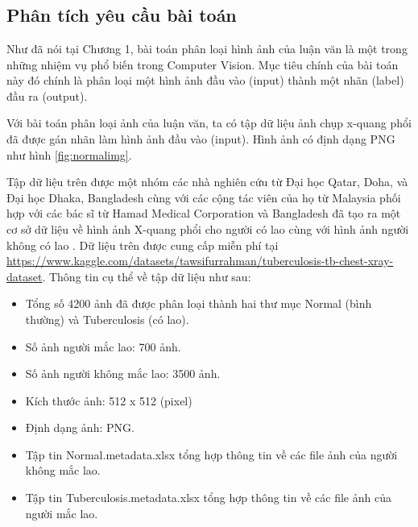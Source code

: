 \setcounter{chapter}{2}
\chapter{\tenchuongiii}
\section{Phân tích yêu cầu bài toán}
Như đã nói tại Chương 1, bài toán phân loại hình ảnh của luận văn là một trong những nhiệm vụ phổ biến trong Computer Vision. Mục tiêu chính của bài toán này đó chính là phân loại một hình ảnh đầu vào (input) thành một nhãn (label) đầu ra (output).  

Với bài toán phân loại ảnh của luận văn, ta có tập dữ liệu ảnh chụp x-quang phổi đã được gán nhãn làm hình ảnh đầu vào (input). Hình ảnh có định dạng PNG như hình \ref{fig:normalimg}.

Tập dữ liệu trên được một nhóm các nhà nghiên cứu từ Đại học Qatar, Doha, và Đại học Dhaka, Bangladesh cùng với các cộng tác viên của họ từ Malaysia phối hợp với các bác sĩ từ Hamad Medical Corporation và Bangladesh đã tạo ra một cơ sở dữ liệu về hình ảnh X-quang phổi cho người có lao cùng với hình ảnh người không có lao \cite{dataset}. Dữ liệu trên được cung cấp miễn phí tại \href{https://www.kaggle.com/datasets/tawsifurrahman/tuberculosis-tb-chest-xray-dataset}{https://www.kaggle.com/datasets/tawsifurrahman/tuberculosis-tb-chest-xray-dataset}. Thông tin cụ thể về tập dữ liệu như sau:
\begin{itemize}
	\item Tổng số 4200 ảnh đã được phân loại thành hai thư mục Normal (bình thường) và Tuberculosis (có lao).
	\item Số ảnh người mắc lao: 700 ảnh.
	\item Số ảnh người không mắc lao: 3500 ảnh.
	\item Kích thước ảnh: 512 x 512 (pixel)
	\item Định dạng ảnh: PNG.
	\item Tập tin Normal.metadata.xlsx tổng hợp thông tin về các file ảnh của người không mắc lao.
	\item Tập tin Tuberculosis.metadata.xlsx tổng hợp thông tin về các file ảnh của người mắc lao.
\end{itemize}


